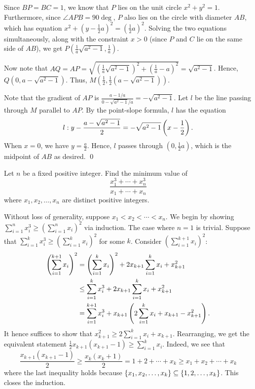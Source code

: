 Since $BP = BC = 1$, we know that $P$ lies on the unit circle $x^2 + y^2 = 1$. Furthermore, since $\angle APB = 90\deg$, $P$ also lies on the circle with diameter $AB$, which has equation $x^2 + (y - \frac12 a)^2 = (\frac12 a)^2$. Solving the two equations simultaneously, along with the constraint $x > 0$ (since $P$ and $C$ lie on the same side of $AB$), we get $P(\frac1a \sqrt{a^2 - 1}, \frac1a)$.

Now note that $AQ = AP = \sqrt{(\frac1a \sqrt{a^2 - 1})^2 + (\frac1a - a)^2} = \sqrt{a^2 - 1}$. Hence, $Q(0, a - \sqrt{a^2 - 1})$. Thus, $M(\frac12, \frac12 (a - \sqrt{a^2 - 1}))$.

Note that the gradient of $AP$ is $\frac{a-1/a}{0 - \sqrt{a^2 - 1}/a} = -\sqrt{a^2 - 1}$. Let $l$ be the line passing through $M$ parallel to $AP$. By the point-slope formula, $l$ has the equation \[l : y - \frac{a-\sqrt{a^2 - 1}}{2} = -\sqrt{a^2 - 1} \left( x - \frac12 \right).\] When $x = 0$, we have $y = \frac{a}2$. Hence, $l$ passes through $(0, \frac12 a)$, which is the midpoint of $AB$ as desired. \qed


\clearpage
\begin{question}[$\frac12 n{(n+1)}$]\label{A::2024-O-2-2}
    Let $n$ be a fixed positive integer. Find the minimum value of \[\frac{x_1^3 + \cdots + x_n^3}{x_1 + \cdots + x_n}\] where $x_1, x_2, \ldots, x_n$ are distinct positive integers.
\end{question}


 Without loss of generality, suppose $x_1 < x_2 < \cdots < x_n$. We begin by showing $\sum_{i=1}^{n} x_i^3 \geq (\sum_{i=1}^n x_i)^2$ via induction. The case where $n = 1$ is trivial. Suppose that $\sum_{i=1}^{k} x_i^3 \geq (\sum_{i=1}^k x_i)^2$ for some $k$. Consider $(\sum_{i=1}^{k+1} x_i)^2$:
\begin{align*}
    \left( \sum_{i=1}^{k+1} x_i \right)^2 &= \left( \sum_{i=1}^{k} x_i \right)^2 + 2x_{k+1}\sum_{i=1}^{k} x_i + x_{k+1}^2\\
    &\leq \sum_{i=1}^{k} x_i^3 + 2x_{k+1}\sum_{i=1}^{k} x_i + x_{k+1}^2\\
    &= \sum_{i=1}^{k+1} x_i^3 + x_{k+1} \left( 2\sum_{i=1}^{k} x_i + x_{k+1} - x_{k+1}^2 \right).
\end{align*}
It hence suffices to show that $x_{k+1}^2 \geq 2\sum_{i=1}^{k} x_i + x_{k+1}$. Rearranging, we get the equivalent statement $\frac12 x_{k+1} (x_{k+1} - 1) \geq \sum_{i=1}^k x_i$. Indeed, we see that \[\frac{x_{k+1}(x_{k+1} - 1)}2 \geq \frac{x_k (x_k + 1)}2 = 1 + 2 + \cdots + x_k \geq x_1 + x_2 + \cdots + x_k\] where the last inequality holds because $\left\lbrace x_1, x_2, \ldots, x_k \right\rbrace \subseteq \left\lbrace 1, 2, \ldots, x_k \right\rbrace$. This closes the induction.

